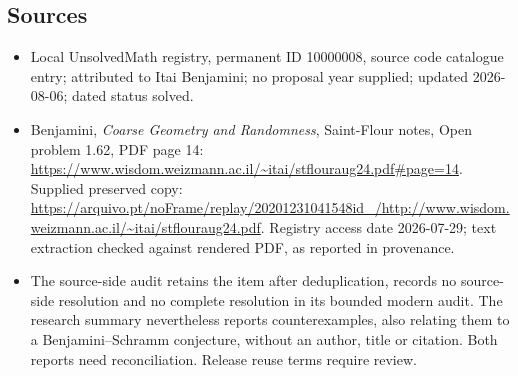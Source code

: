 \documentclass[11pt]{article}
\begin{document}
\subsection{Sources}
\begin{itemize}
\item Local UnsolvedMath registry, permanent ID 10000008, source code catalogue entry; attributed to Itai Benjamini; no proposal year supplied; updated 2026-08-06; dated status solved.
\item Benjamini, \emph{Coarse Geometry and Randomness}, Saint-Flour notes, Open problem 1.62, PDF page 14: \url{https://www.wisdom.weizmann.ac.il/~itai/stflouraug24.pdf#page=14}. Supplied preserved copy: \url{https://arquivo.pt/noFrame/replay/20201231041548id_/http://www.wisdom.weizmann.ac.il/~itai/stflouraug24.pdf}. Registry access date 2026-07-29; text extraction checked against rendered PDF, as reported in provenance.
\item The source-side audit retains the item after deduplication, records no source-side resolution and no complete resolution in its bounded modern audit. The research summary nevertheless reports counterexamples, also relating them to a Benjamini--Schramm conjecture, without an author, title or citation. Both reports need reconciliation. Release reuse terms require review.
\end{itemize}
\end{document}
